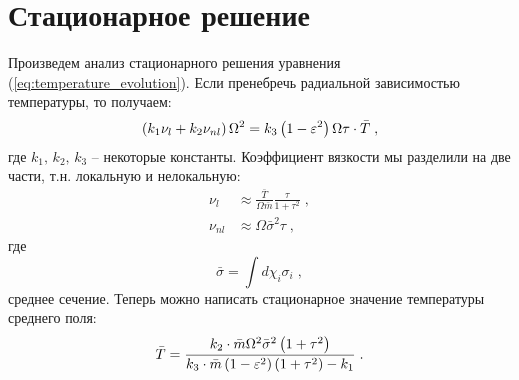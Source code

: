 \section{Стационарное решение}
Произведем анализ стационарного решения уравнения (\ref{eq:temperature_evolution}). Если пренебречь радиальной зависимостью
температуры, то получаем:
\begin{equation}
    \left(k_1\nu_{l}+k_2\nu_{nl}\right)\Omega^2=k_3\left(1-\varepsilon^2\right)\Omega\tau\cdot\bar{T}\;,
\end{equation}
где $k_1,\,k_2,\,k_3$ -- некоторые константы. Коэффициент вязкости мы разделили на две части, т.н. локальную и нелокальную:
\begin{equation}
    \begin{split}
        \nu_{l}&\approx\frac{\bar{T}}{\Omega\bar{m}}\frac{\tau}{1+\tau^2}\;,\\
        \nu_{nl}&\approx\Omega\bar{\sigma}^2\tau\;,
    \end{split}
\end{equation}
где
\begin{equation}
  \bar{\sigma}=\int d\chi_i\sigma_i\;,
\end{equation}
среднее сечение. Теперь можно написать стационарное значение температуры среднего поля:
\begin{equation}
    \bar{T} = \frac{k_2\cdot\bar{m}\Omega^2\bar{\sigma}^2\left(1+\tau^2\right)}{k_3\cdot\bar{m}\left(1-\varepsilon^2\right)\left(1+\tau^2\right)-k_1}\;.
\end{equation}






